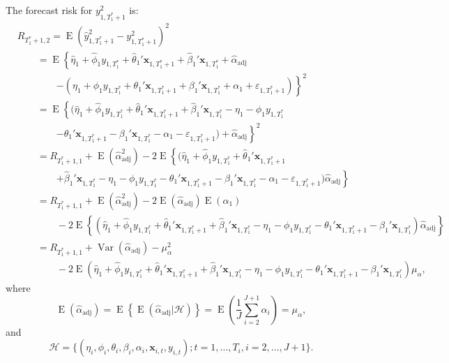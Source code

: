 \documentclass[11pt]{article}
\newcommand{\x}{\textbf{x}}
\newcommand{\Hist}{\mathcal{H}}
\DeclareMathOperator{\E}{E}
\DeclareMathOperator{\Var}{Var}
\begin{document}
The forecast risk for $y_{1,T^*_1+1}^2$ is: 
\begin{align*}
  &R_{T_1^*+1, 2} = \E(\hat y_{1,T_1^*+1}^2 - y_{1,T_1^*+1}^2)^2 \\
    &\qquad= \E\left\{ \hat\eta_1 + \hat\phi_1 y_{1,T_1^*} 
      + \hat\theta_1'\x_{1,T_1^*+1} + \hat\beta_1'\x_{1,T_1^*} 
      + \hat{\alpha}_{\text{adj}}\right. \\
        &\qquad\qquad\left.- (\eta_1 + \phi_1 y_{1,T_1^*} + \theta_1'\x_{1,T_1^*+1} 
          + \beta_1'\x_{1,T_1^*} + \alpha_1 + \varepsilon_{1,T_1^*+1}) \right\}^2 \\
    &\qquad= \E\left\{ (\hat\eta_1 + \hat\phi_1 y_{1,T_1^*} + \hat\theta_1'\x_{1,T_1^*+1} 
      + \hat\beta_1'\x_{1,T_1^*} - \eta_1 - \phi_1 y_{1,T_1^*}\right. \\ 
        &\qquad\qquad\left.- \theta_1'\x_{1,T_1^*+1} - \beta_1'\x_{1,T_1^*} 
          - \alpha_1 - \varepsilon_{1,T_1^*+1}) + \hat{\alpha}_{\text{adj}} \right\}^2 \\      
    &\qquad= R_{T_1^*+1, 1} + \E(\hat{\alpha}_{\text{adj}}^2) - 2\E\left\{(\hat\eta_1 
      + \hat\phi_1 y_{1,T_1^*} + \hat\theta_1'\x_{1,T_1^*+1}\right. \\
        &\qquad\qquad\left. + \hat\beta_1'\x_{1,T_1^*} - \eta_1 - \phi_1 y_{1,T_1^*} 
          - \theta_1'\x_{1,T_1^*+1} - \beta_1'\x_{1,T_1^*} - \alpha_1 
          - \varepsilon_{1,T_1^*+1})\hat{\alpha}_{\text{adj}} \right\} \\
    &\qquad= R_{T_1^*+1, 1} + \E(\hat{\alpha}_{\text{adj}}^2) 
      - 2\E(\hat{\alpha}_{\text{adj}})\E(\alpha_1) \\
      &\qquad\qquad- 2\E\left\{(\hat\eta_1 + \hat\phi_1 y_{1,T_1^*} + \hat\theta_1'\x_{1,T_1^*+1} 
        + \hat\beta_1'\x_{1,T_1^*} - \eta_1 - \phi_1 y_{1,T_1^*} 
        - \theta_1'\x_{1,T_1^*+1} - \beta_1'\x_{1,T_1^*})\hat{\alpha}_{\text{adj}} \right\} \\
    &\qquad= R_{T_1^*+1, 1} + \Var(\hat{\alpha}_{\text{adj}}) - \mu_{\alpha}^2 \\
      &\qquad\qquad- 2\E\left(\hat\eta_1 + \hat\phi_1 y_{1,T_1^*} 
        + \hat\theta_1'\x_{1,T_1^*+1} + \hat\beta_1'\x_{1,T_1^*} - \eta_1 - \phi_1 y_{1,T_1^*} 
        - \theta_1'\x_{1,T_1^*+1} - \beta_1'\x_{1,T_1^*}\right)\mu_{\alpha},
\end{align*}
where 
$$
  \E(\hat{\alpha}_{\text{adj}}) = \E\left\{\E(\hat{\alpha}_{\text{adj}}| \Hist )\right\}
    = \E\left(\frac{1}{J}\sum_{i=2}^{J+1}\alpha_i\right) 
    = \mu_{\alpha},
$$
and 
$$
  \Hist = \{(\eta_i, \phi_i, \theta_i, \beta_i, \alpha_i, \x_{i,t}, y_{i,t}); 
    t = 1,\ldots,T_i, i = 2,\ldots,J+1\}.
$$
\end{document}
